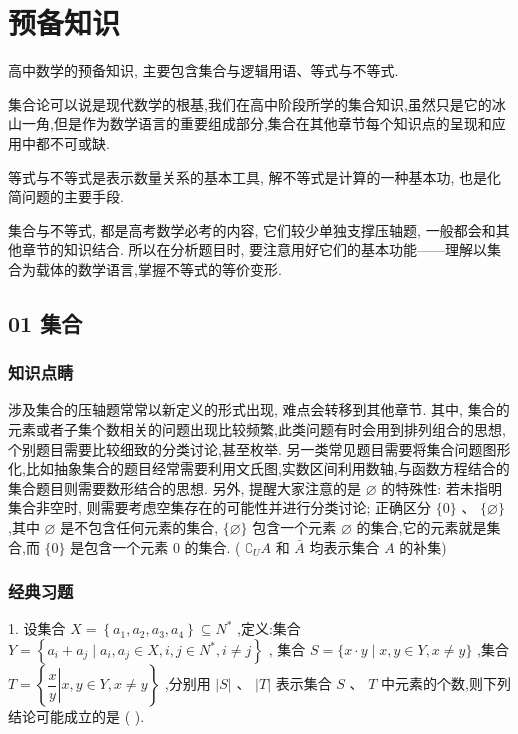 \section*{预备知识}

高中数学的预备知识, 主要包含集合与逻辑用语、等式与不等式.

集合论可以说是现代数学的根基,我们在高中阶段所学的集合知识,虽然只是它的冰山一角,但是作为数学语言的重要组成部分,集合在其他章节每个知识点的呈现和应用中都不可或缺.

等式与不等式是表示数量关系的基本工具, 解不等式是计算的一种基本功, 也是化简问题的主要手段.

集合与不等式, 都是高考数学必考的内容, 它们较少单独支撑压轴题, 一般都会和其他章节的知识结合. 所以在分析题目时, 要注意用好它们的基本功能——理解以集合为载体的数学语言,掌握不等式的等价变形.

\subsection*{01 集合}

\subsubsection*{知识点睛}

涉及集合的压轴题常常以新定义的形式出现, 难点会转移到其他章节. 其中, 集合的元素或者子集个数相关的问题出现比较频繁,此类问题有时会用到排列组合的思想,个别题目需要比较细致的分类讨论,甚至枚举. 另一类常见题目需要将集合问题图形化,比如抽象集合的题目经常需要利用文氏图,实数区间利用数轴,与函数方程结合的集合题目则需要数形结合的思想. 另外, 提醒大家注意的是 $\varnothing$ 的特殊性: 若未指明集合非空时, 则需要考虑空集存在的可能性并进行分类讨论; 正确区分 $\{ 0\} \text{ 、 }\{ \varnothing \}$ ,其中 $\varnothing$ 是不包含任何元素的集合, $\{ \varnothing \}$ 包含一个元素 $\varnothing$ 的集合,它的元素就是集合,而 $\{ 0\}$ 是包含一个元素 0 的集合. ( ${\complement }_{U}A$ 和 $\bar{A}$ 均表示集合 $A$ 的补集)

\subsubsection*{经典习题}

1. 设集合 $X = \left\{  {{a}_{1},{a}_{2},{a}_{3},{a}_{4}}\right\}   \subseteq  {{N}}^{ * }$ ,定义:集合 $Y = \left\{  {{a}_{i} + {a}_{j} \mid  {a}_{i},{a}_{j} \in  X,i,j \in  {{N}}^{ * },i \neq  j}\right\}$ , 集合 $S = \{ x \cdot  y \mid  x,y \in  Y,x \neq  y\}$ ,集合 $T = \left\{  {\left. \dfrac{x}{y}\right| x,y \in  Y,x \neq  y}\right\}$ ,分别用 $\left| S\right| \text{ 、 }\left| T\right|$ 表示集合 $S\text{ 、 }T$ 中元素的个数,则下列结论可能成立的是 (   ).

